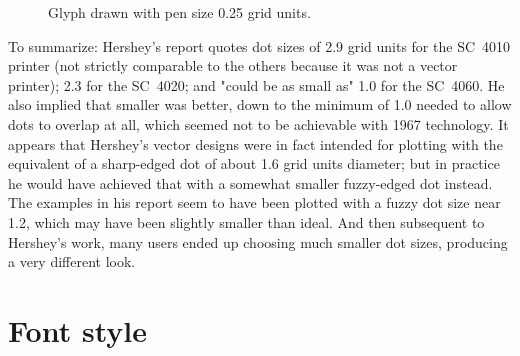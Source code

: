 \documentclass{article}
\newcommand{\SegRad}{0.79}
\newcommand{\FatSegment}[2]{%
($(#1)!\SegRad cm!90:(#2)$) %
  ..controls ($(#1)!1.12*\SegRad cm!120:(#2)$) %
         and ($(#1)!1.12*\SegRad cm!150:(#2)$).. %
($(#1)!-\SegRad cm!0:(#2)$) %
  ..controls ($(#1)!1.12*\SegRad cm!-150:(#2)$) %
         and ($(#1)!1.12*\SegRad cm!-120:(#2)$).. %
($(#1)!\SegRad cm!-90:(#2)$) -- %
($(#2)!\SegRad cm!90:(#1)$) %
  ..controls ($(#2)!1.12*\SegRad cm!120:(#1)$) %
         and ($(#2)!1.12*\SegRad cm!150:(#1)$).. %
($(#2)!-\SegRad cm!0:(#1)$) %
  ..controls ($(#2)!1.12*\SegRad cm!-150:(#1)$) %
         and ($(#2)!1.12*\SegRad cm!-120:(#1)$).. %
($(#2)!\SegRad cm!-90:(#1)$) -- %
cycle %
}
\begin{document}
\begin{figure}
  \centering\renewcommand{\SegRad}{0.125}
  \caption{Glyph drawn with pen size 0.25 grid units.}
  \label{fig:capa-vthin}
\end{figure}

To summarize:  Hershey's report quotes dot sizes of 2.9 grid units for the
SC~4010 printer (not strictly comparable to the others because it was not a
vector printer); 2.3 for the SC~4020; and "could be as small as" 1.0 for the
SC~4060.  He also implied that smaller was better, down to the minimum of
1.0 needed to allow dots to overlap at all, which seemed not to be
achievable with 1967 technology.  It appears that Hershey's vector designs
were in fact intended for plotting with the equivalent of a sharp-edged dot
of about 1.6 grid units diameter; but in practice he would have achieved
that with a somewhat smaller fuzzy-edged dot instead.  The examples in his
report seem to have been plotted with a fuzzy dot size near 1.2, which may
have been slightly smaller than ideal.  And then subsequent to Hershey's
work, many users ended up choosing much smaller dot sizes, producing a very
different look.


\section{Font style}
\end{document}
